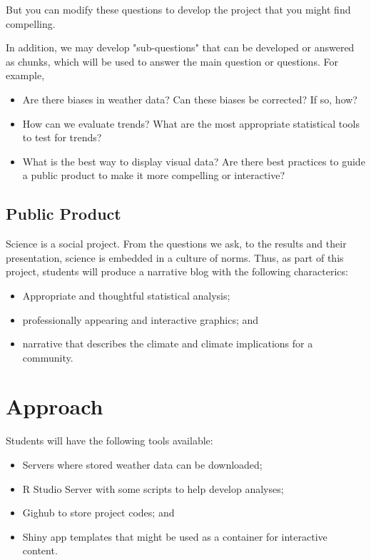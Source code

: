 \documentclass{article}\usepackage[]{graphicx}\usepackage[]{color}
\begin{document}
But you can modify these questions to develop the project that you might find compelling.

In addition, we may develop "sub-questions" that can be developed or answered as chunks, which will be used to answer the main question or questions. For example, 

\begin{itemize}
  \item Are there biases in weather data? Can these biases be corrected? If so, how?
  \item How can we evaluate trends? What are the most appropriate statistical tools to test for trends?
  \item What is the best way to display visual data?  Are there best practices to guide a public product to make it more compelling or interactive?
\end{itemize}

\subsection{Public Product}

Science is a social project. From the questions we ask, to the results and their presentation, science is embedded in a culture of norms. Thus, as part of this project, students will produce a narrative blog with the following characterics:

\begin{itemize}
  \item Appropriate and thoughtful statistical analysis;
  \item professionally appearing and interactive graphics; and 
  \item narrative that describes the climate and climate implications for a community.
\end{itemize}

\section{Approach}

Students will have the following tools available:

\begin{itemize}
  \item Servers where stored weather data can be downloaded;
  \item R Studio Server with some scripts to help develop analyses;
  \item Gighub to store project codes; and
  \item Shiny app templates that might be used as a container for interactive content.
\end{itemize}
\end{document}
